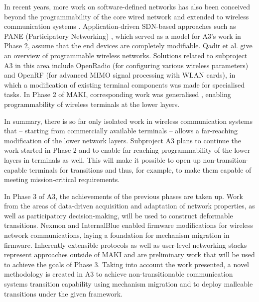 In recent years, more work on software-defined networks \cite{A3:Kreutz:2015, A3:Monsanto2013} has also been conceived beyond the programmability of the core wired network and extended to wireless communication systems \cite{A3:Bernados:WirelessCommunication, A3:Jagadeesan:2014}. Application-driven SDN-based approaches such as PANE (Participatory Networking) \cite{A3:Ferguson2013}, which served as a model for A3's work in Phase 2, assume that the end devices are completely modifiable. Qadir et al. \cite{A3:Qadir2014} give an overview of programmable wireless networks. Solutions related to subproject A3 in this area include OpenRadio (for configuring various wireless parameters) and OpenRF (for advanced MIMO signal processing with WLAN cards), in which a modification of existing terminal components was made for specialised tasks.
In Phase 2 of MAKI, corresponding work was generalised \cite{A3:ScWeHo2018, A3:GrScLiHo2019, A3:ScLiGrHo2018,A3:MaClScHo2019}, enabling programmability of wireless terminals at the lower layers.

In summary, there is so far only isolated work in wireless communication systems that -- starting from commercially available terminals -- allows a far-reaching modification of the lower network layers. Subproject A3 plans to continue the work started in Phase 2 and to enable far-reaching programmability of the lower layers in terminals as well. This will make it possible to open up non-transition-capable terminals for transitions and thus, for example, to make them capable of meeting mission-critical requirements. 



In Phase 3 of A3, the achievements of the previous phases are taken up.
Work from the areas of data-driven acquisition and adaptation of network properties, as well as participatory decision-making, will be used to construct deformable transitions. 
Nexmon and InternalBlue enabled firmware modifications for wireless network communications, laying a foundation for mechanism migration in firmware.
Inherently extensible protocols as well as user-level networking stacks represent approaches outside of MAKI and are preliminary work that will be used to achieve the goals of Phase 3. 
Taking into account the work presented, a novel methodology is created in A3 to achieve non-transitionable communication systems transition capability using mechanism migration and to deploy malleable transitions under the given framework.
